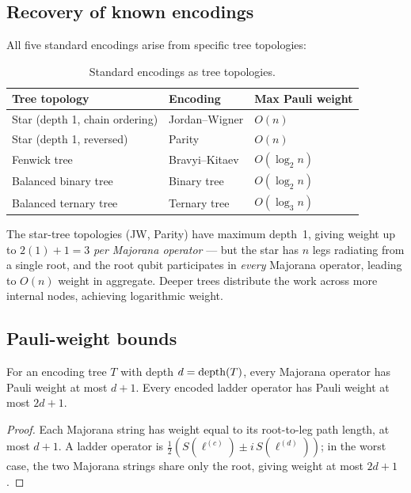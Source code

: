 \subsection{Recovery of known encodings}
\label{sec:recovery}

All five standard encodings arise from specific tree topologies:

\begin{table}[t]
\centering
\caption{Standard encodings as tree topologies.}
\label{tab:tree-encodings}
\begin{tabular}{@{}lll@{}}
\toprule
Tree topology & Encoding & Max Pauli weight \\
\midrule
Star (depth 1, chain ordering) & Jordan--Wigner & $O(n)$ \\
Star (depth 1, reversed) & Parity & $O(n)$ \\
Fenwick tree & Bravyi--Kitaev & $O(\log_2 n)$ \\
Balanced binary tree & Binary tree & $O(\log_2 n)$ \\
Balanced ternary tree & Ternary tree & $O(\log_3 n)$ \\
\bottomrule
\end{tabular}
\end{table}

The star-tree topologies (JW, Parity) have maximum depth~1, giving
weight up to $2(1) + 1 = 3$ \emph{per Majorana operator} --- but the
star has $n$ legs radiating from a single root, and the root qubit
participates in \emph{every} Majorana operator, leading to $O(n)$
weight in aggregate.  Deeper trees distribute the work across more
internal nodes, achieving logarithmic weight.

\subsection{Pauli-weight bounds}
\label{sec:weight-bounds}

\begin{theorem}
\label{thm:weight-bound}
For an encoding tree $T$ with depth $d = \mathrm{depth}(T)$, every Majorana
operator has Pauli weight at most $d + 1$.  Every encoded ladder
operator has Pauli weight at most $2d + 1$.
\end{theorem}

\begin{proof}
Each Majorana string has weight equal to its root-to-leg path length,
at most $d + 1$.  A ladder operator is
$\tfrac{1}{2}(S(\ell^{(c)}) \pm i\,S(\ell^{(d)}))$; in the worst
case, the two Majorana strings share only the root, giving weight at
most $2d + 1$.
\end{proof}

